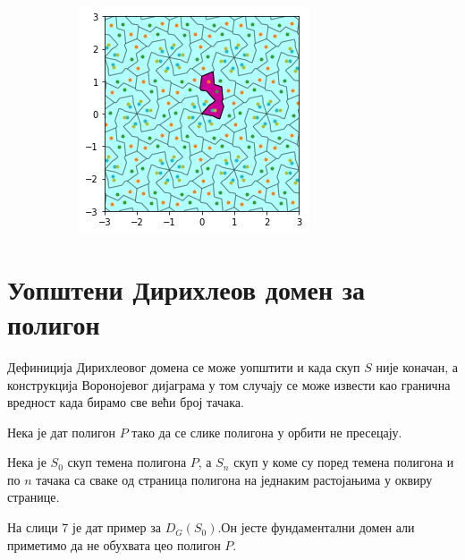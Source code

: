 \documentclass[12pt]{report}
\begin{document}
\begin{samepage}
\begin{figure}[H]
\begin{subfigure}[b]{0.3\textwidth}
    \label{fig:f5}
  \end{subfigure}
  \begin{subfigure}[b]{0.3\textwidth}
    \includegraphics[width=\textwidth]{output_16_0.png}
    \label{fig:f6}
  \end{subfigure}
\end{figure}
\end{samepage}

    \section{Уопштени Дирихлеов домен за полигон}\label{modifikacija-fundamentalne-oblasti-na-osnovu-podfundamentalne}
Дефиниција Дирихлеовог домена се може уопштити и када скуп $S$ није коначан, а конструкција Воронојевог дијаграма у том случају се може извести као гранична вредност када бирамо све већи број тачака.

Нека је дат полигон $P$ тако да се слике полигона у орбити не пресецају. 


Нека је $S_0$ скуп темена полигона $P$, а $S_n$ скуп у коме су поред темена полигона и по $n$ тачака са сваке од страница полигона на једнаким растојањима у оквиру странице.

На слици 7 је дат пример за $D_G(S_0)$.Он јесте фундаментални домен али приметимо да не обухвата цео полигон $P$.
\end{document}
